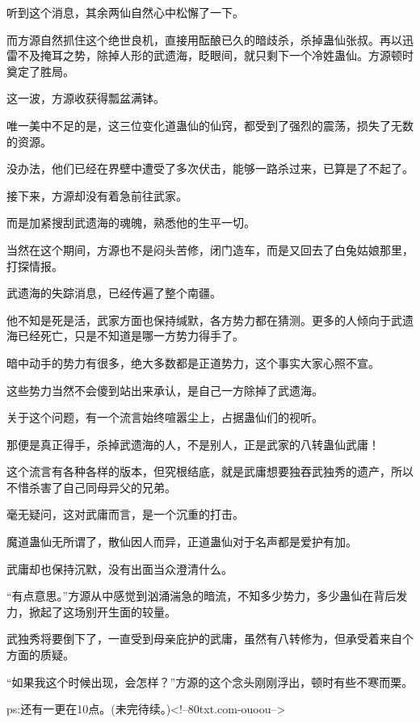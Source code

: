 \begin{this_body}
听到这个消息，其余两仙自然心中松懈了一下。

而方源自然抓住这个绝世良机，直接用酝酿已久的暗歧杀，杀掉蛊仙张叔。再以迅雷不及掩耳之势，除掉人形的武遗海，眨眼间，就只剩下一个冷姓蛊仙。方源顿时奠定了胜局。

这一波，方源收获得瓢盆满钵。

唯一美中不足的是，这三位变化道蛊仙的仙窍，都受到了强烈的震荡，损失了无数的资源。

没办法，他们已经在界壁中遭受了多次伏击，能够一路杀过来，已算是了不起了。

接下来，方源却没有着急前往武家。

而是加紧搜刮武遗海的魂魄，熟悉他的生平一切。

当然在这个期间，方源也不是闷头苦修，闭门造车，而是又回去了白兔姑娘那里，打探情报。

武遗海的失踪消息，已经传遍了整个南疆。

他不知是死是活，武家方面也保持缄默，各方势力都在猜测。更多的人倾向于武遗海已经死亡，只是不知道是哪一方势力得手了。

暗中动手的势力有很多，绝大多数都是正道势力，这个事实大家心照不宣。

这些势力当然不会傻到站出来承认，是自己一方除掉了武遗海。

关于这个问题，有一个流言始终喧嚣尘上，占据蛊仙们的视听。

那便是真正得手，杀掉武遗海的人，不是别人，正是武家的八转蛊仙武庸！

这个流言有各种各样的版本，但究根结底，就是武庸想要独吞武独秀的遗产，所以不惜杀害了自己同母异父的兄弟。

毫无疑问，这对武庸而言，是一个沉重的打击。

魔道蛊仙无所谓了，散仙因人而异，正道蛊仙对于名声都是爱护有加。

武庸却也保持沉默，没有出面当众澄清什么。

“有点意思。”方源从中感觉到汹涌湍急的暗流，不知多少势力，多少蛊仙在背后发力，掀起了这场别开生面的较量。

武独秀将要倒下了，一直受到母亲庇护的武庸，虽然有八转修为，但承受着来自个方面的质疑。

“如果我这个时候出现，会怎样？”方源的这个念头刚刚浮出，顿时有些不寒而栗。

ps:还有一更在10点。(未完待续。)<!--80txt.com-ouoou-->

\end{this_body}

